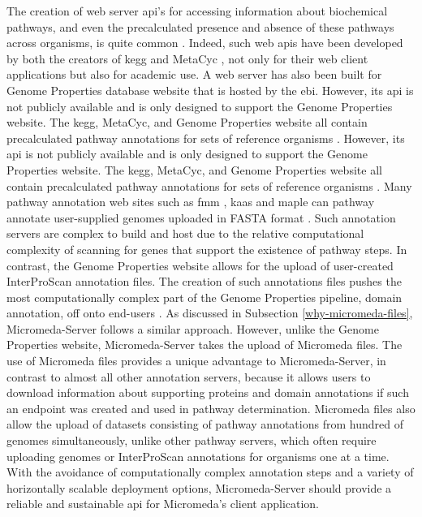 The creation of web server \gls{api}'s for accessing information about biochemical pathways, and even the precalculated presence and absence of these pathways across organisms, is quite common \cite{wu2006kobas,moriya2010pathpred,pireddu2006path,vallenet2009microscope,aziz2008rast,takami2016automated,moriya2007kaas,chou2009fmm}. Indeed, such web \gls{api}s have been developed by both the creators of \gls{kegg} \cite{kawashima2003kegg} and MetaCyc \cite{karp2013data}, not only for their web client applications but also for academic use. A web server has also been built for Genome Properties database website \cite{richardson2018genome} that is hosted by the \gls{ebi}. However, its \gls{api} is not publicly available and is only designed to support the Genome Properties website. The \gls{kegg}, MetaCyc, and Genome Properties website all contain precalculated pathway annotations for sets of reference organisms \cite{kanehisa2000kegg,karp2002metacyc,karp2013data}. However, its \gls{api} is not publicly available and is only designed to support the Genome Properties website. The \gls{kegg}, MetaCyc, and Genome Properties website all contain precalculated pathway annotations for sets of reference organisms \cite{kanehisa2000kegg,karp2002metacyc,karp2013data}. Many pathway annotation web sites such as \gls{fmm} \cite{chou2009fmm}, \gls{kaas} \cite{moriya2007kaas} and \gls{maple} \cite{takami2016automated} can pathway annotate user-supplied genomes uploaded in FASTA format \cite{pearson19905}. Such annotation servers are complex to build and host due to the relative computational complexity of scanning for genes that support the existence of pathway steps. In contrast, the Genome Properties website allows for the upload of user-created InterProScan annotation files. The creation of such annotations files pushes the most computationally complex part of the Genome Properties pipeline, domain annotation, off onto end-users \cite{richardson2018genome}. As discussed in Subsection \ref{why-micromeda-files}, Micromeda-Server follows a similar approach. However, unlike the Genome Properties website, Micromeda-Server takes the upload of Micromeda files. The use of Micromeda files provides a unique advantage to Micromeda-Server, in contrast to almost all other annotation servers, because it allows users to download information about supporting proteins and domain annotations if such an endpoint was created and used in pathway determination. Micromeda files also allow the upload of datasets consisting of pathway annotations from hundred of genomes simultaneously, unlike other pathway servers, which often require uploading genomes or InterProScan annotations for organisms one at a time. With the avoidance of computationally complex annotation steps and a variety of horizontally scalable deployment options, Micromeda-Server should provide a reliable and sustainable \gls{api} for Micromeda's client application.